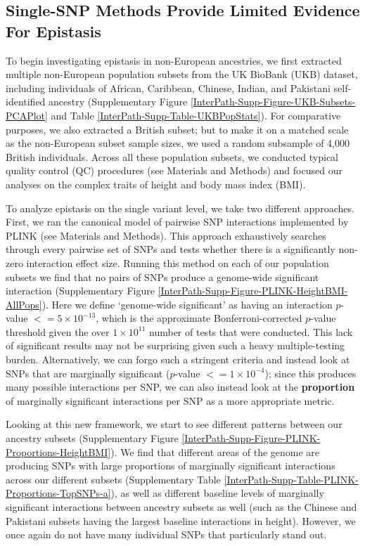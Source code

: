 \documentclass[12pt,a4paper]{article}
\begin{document}
\subsection{Single-SNP Methods Provide Limited Evidence For Epistasis}\label{InterPath-Results-SNPEpistasis}

To begin investigating epistasis in non-European ancestries, we first extracted multiple non-European population subsets from the UK BioBank (UKB) dataset, including individuals of African, Caribbean, Chinese, Indian, and Pakistani self-identified ancestry (Supplementary Figure \ref{InterPath-Supp-Figure-UKB-Subsets-PCAPlot} and Table \ref{InterPath-Supp-Table-UKBPopStats}). For comparative purposes, we also extracted a British subset; but to make it on a matched scale as the non-European subset sample sizes, we used a random subsample of 4,000 British individuals. Across all these population subsets, we conducted typical quality control (QC) procedures (see Materials and Methods) and focused our analyses on the complex traits of height and body mass index (BMI). 

To analyze epistasis on the single variant level, we take two different approaches. First, we ran the canonical model of pairwise SNP interactions implemented by PLINK (see Materials and Methods). This approach exhaustively searches through every pairwise set of SNPs and tests whether there is a significantly non-zero interaction effect size. Running this method on each of our population subsets we find that no pairs of SNPs produce a genome-wide significant interaction (Supplementary Figure \ref{InterPath-Supp-Figure-PLINK-HeightBMI-AllPops}). Here we define `genome-wide significant' as having an interaction $p$-value $<= 5\times10^{-13}$, which is the approximate Bonferroni-corrected $p$-value threshold given the over $1\times10^{11}$ number of tests that were conducted. This lack of significant results may not be surprising given such a heavy multiple-testing burden. Alternatively, we can forgo such a stringent criteria and instead look at SNPs that are marginally significant ($p$-value $<= 1\times10^{-4}$); since this produces many possible interactions per SNP, we can also instead look at the \textbf{proportion} of marginally significant interactions per SNP as a more appropriate metric.  

Looking at this new framework, we start to see different patterns between our ancestry subsets (Supplementary Figure \ref{InterPath-Supp-Figure-PLINK-Proportions-HeightBMI}). We find that different areas of the genome are producing SNPs with large proportions of marginally significant interactions across our different subsets (Supplementary Table \ref{InterPath-Supp-Table-PLINK-Proportions-TopSNPs-a}), as well as different baseline levels of marginally significant interactions between ancestry subsets as well (such as the Chinese and Pakistani subsets having the largest baseline interactions in height). However, we once again do not have many individual SNPs that particularly stand out. 
\end{document}
